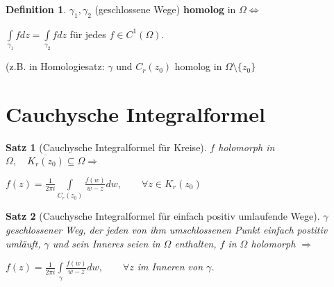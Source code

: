 \documentclass[ngerman,halfparskip]{scrartcl}
\newtheorem{satz}{Satz}[section]
\theoremstyle{definition}
\newtheorem{defin}{Definition}[section]
\begin{document}
\begin{defin}
$\gamma_1,\gamma_2$ (geschlossene Wege) \textbf{homolog} in $\Omega \Leftrightarrow$

$\int\limits_{\gamma_1}fdz=\int\limits_{\gamma_2}fdz$ für jedes $f\in C^1(\Omega)$.

(z.B. in Homologiesatz: $\gamma$ und $C_r(z_0)$ homolog in $\Omega\setminus\{z_0\}$
\end{defin}

\section{Cauchysche Integralformel}
\begin{satz}[Cauchysche Integralformel für Kreise]
$f$ holomorph in $\Omega,\quad \overline{K_r(z_0)}\subseteq\Omega \Rightarrow$

$f(z)=\frac 1{2\pi i } \int \limits _{C_r(z_0)}\frac {f(w)}{w-z}dw, \qquad \forall z\in K_r(z_0)$
\end{satz}

\begin{satz}[Cauchysche Integralformel für einfach positiv umlaufende Wege] 
$\gamma$ geschlossener Weg, der jeden von ihm umschlossenen Punkt einfach postitiv umläuft, $\gamma$ und sein Inneres seien in $\Omega$ enthalten, $f$ in $\Omega$ holomorph $\Rightarrow$

$f(z)=\frac 1 {2\pi i} \int\limits_\gamma \frac {f(w)}{w-z}dw, \qquad \forall z$ im Inneren von $\gamma$.
 
\end{satz}
\end{document}
